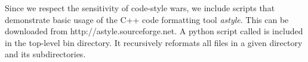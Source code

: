 Since we respect the sensitivity of code-style wars, we include scripts that demonstrate basic usage of the C++ code formatting tool \emph{astyle}.
This can be downloaded from {http://astyle.sourceforge.net}. 
A python script called  is included in the top-level bin directory.
It recursively reformats all files in a given directory and its subdirectories.


